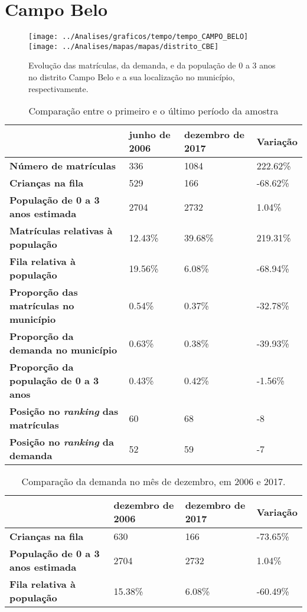 \section{Campo Belo}
\begin{figure}[H]
	\centering
	\texttt{[image: ../Analises/graficos/tempo/tempo\_CAMPO\_BELO]}
	\texttt{[image: ../Analises/mapas/mapas/distrito\_CBE]}
	\caption{Evolução das matrículas, da demanda, e da população de 0 a 3 anos no distrito Campo Belo e a sua localização no município, respectivamente.}
\end{figure}
\begin{table}[H]
	\begin{tabular}{|l|l|l|l|}
		\hline
		\textbf{}                                      & \textbf{junho de 2006}       & \textbf{dezembro de 2017}    & \textbf{Variação} \\ \hline
		\textbf{Número de matrículas}                  & 336 & 1084 & 222.62\% \\ \hline
		\textbf{Crianças na fila}                      & 529 & 166 & -68.62\% \\ \hline
		\textbf{População de 0 a 3 anos estimada}      & 2704 & 2732 & 1.04\% \\ \hline
		\textbf{Matrículas relativas à população}      & 12.43\% & 39.68\% & 219.31\% \\ \hline
		\textbf{Fila relativa à população}             & 19.56\% & 6.08\% & -68.94\% \\ \hline
		\textbf{Proporção das matrículas no município} & 0.54\% & 0.37\% & -32.78\% \\ \hline
		\textbf{Proporção da demanda no município}     & 0.63\% & 0.38\% & -39.93\% \\ \hline
		\textbf{Proporção da população de 0 a 3 anos}  & 0.43\% & 0.42\% & -1.56\% \\ \hline
		\textbf{Posição no \textit{ranking} das matrículas}     & 60 & 68 & -8 \\ \hline
		\textbf{Posição no \textit{ranking} da demanda}         & 52 & 59 & -7 \\ \hline
	\end{tabular}
	\caption{Comparação entre o primeiro e o último período da amostra}
\end{table}
\begin{table}[H]
	\begin{tabular}{|l|l|l|l|}
		\hline
		\textbf{}                                 & \textbf{dezembro de 2006} & \textbf{dezembro de 2017} & \textbf{Variação} \\ \hline
		\textbf{Crianças na fila}                      & 630 & 166 & -73.65\% \\ \hline
		\textbf{População de 0 a 3 anos estimada}      & 2704 & 2732 & 1.04\% \\ \hline
		\textbf{Fila relativa à população}             & 15.38\% & 6.08\% & -60.49\% \\ \hline
	\end{tabular}
	\caption{Comparação da demanda no mês de dezembro, em 2006 e 2017.}
\end{table}
